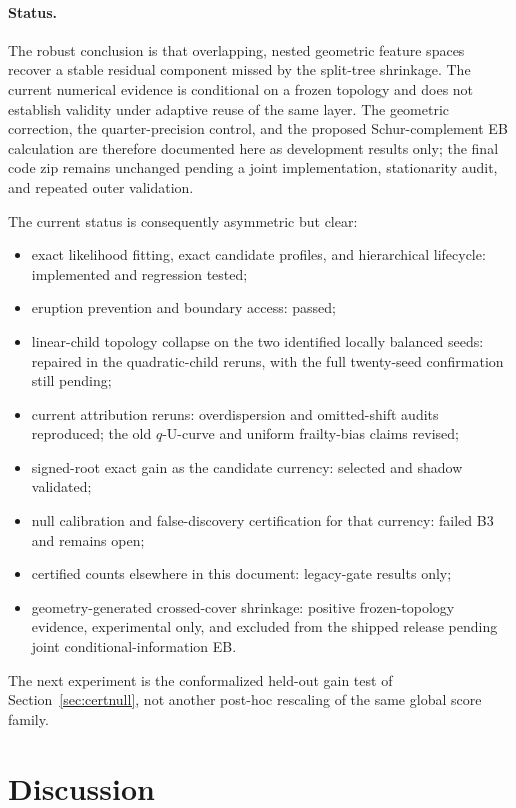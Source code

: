 \documentclass[11pt]{article}
\begin{document}
\paragraph{Status.}
The robust conclusion is that overlapping, nested geometric feature spaces recover a stable residual
component missed by the split-tree shrinkage. The current numerical evidence is conditional on a
frozen topology and does not establish validity under adaptive reuse of the same layer. The geometric
correction, the quarter-precision control, and the proposed Schur-complement EB calculation are
therefore documented here as development results only; the final code zip remains unchanged pending
a joint implementation, stationarity audit, and repeated outer validation.

The current status is consequently asymmetric but clear:
\begin{itemize}[leftmargin=2em,itemsep=1pt]
\item exact likelihood fitting, exact candidate profiles, and hierarchical lifecycle: implemented and
regression tested;
\item eruption prevention and boundary access: passed;
\item linear-child topology collapse on the two identified locally balanced seeds: repaired in the
quadratic-child reruns, with the full twenty-seed confirmation still pending;
\item current attribution reruns: overdispersion and omitted-shift audits reproduced; the old
$q$-U-curve and uniform frailty-bias claims revised;
\item signed-root exact gain as the candidate currency: selected and shadow validated;
\item null calibration and false-discovery certification for that currency: failed B3 and remains open;
\item certified counts elsewhere in this document: legacy-gate results only;
\item geometry-generated crossed-cover shrinkage: positive frozen-topology evidence, experimental
only, and excluded from the shipped release pending joint conditional-information EB.
\end{itemize}
The next experiment is the conformalized held-out gain test of
Section~\ref{sec:certnull}, not another post-hoc rescaling of the same global score family.

\section{Discussion}\label{sec:discussion}
\end{document}
